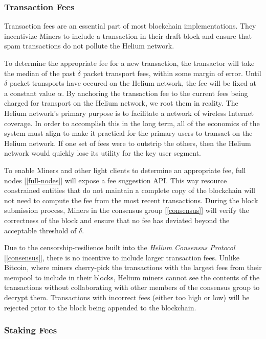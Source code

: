 \documentclass[10pt, nonatbib, nocopyrightspace, reprint]{sigplanconf}
\newcommand{\secref}[1]{[\autoref{#1}]}
\begin{document}
\subsubsection{Transaction Fees} \label{fees}

Transaction fees are an essential part of most blockchain implementations. They incentivize Miners to include a transaction in their draft block and ensure that spam transactions do not pollute the Helium network.

To determine the appropriate fee for a new transaction, the transactor will take the median of the past $\delta$ packet transport fees, within some margin of error. Until $\delta$ packet transports have occured on the Helium network, the fee will be fixed at a constant value $\alpha$. By anchoring the transaction fee to the current fees being charged for transport on the Helium network, we root them in reality. The Helium network's primary purpose is to facilitate a network of wireless Internet coverage. In order to accomplish this in the long term, all of the economics of the system must align to make it practical for the primary users to transact on the Helium network. If one set of fees were to outstrip the others, then the Helium network would quickly lose its utility for the key user segment.

To enable Miners and other light clients to determine an appropriate fee, full nodes \secref{full-nodes} will expose a fee suggestion API. This way resource constrained entities that do not maintain a complete copy of the blockchain will not need to compute the fee from the most recent transactions. During the block submission process, Miners in the consensus group \secref{consensus} will verify the correctness of the block and ensure that no fee has deviated beyond the acceptable threshold of $\delta$.

Due to the censorship-resilience built into the \emph{Helium Consensus Protocol} \secref{consensus}, there is no incentive to include larger transaction fees. Unlike Bitcoin, where miners cherry-pick the transactions with the largest fees from their mempool to include in their blocks, Helium miners cannot see the contents of the transactions without collaborating with other members of the consensus group to decrypt them. Transactions with incorrect fees (either too high or low) will be rejected prior to the block being appended to the blockchain.

\subsubsection{Staking Fees} \label{staking}
\end{document}
